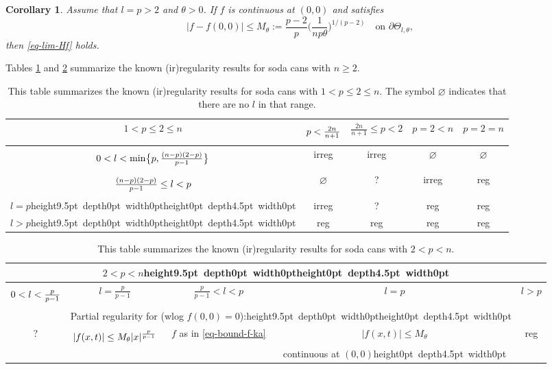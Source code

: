 \documentclass[a4paper, twoside]{article}
\theoremstyle{propositional}
\newtheorem{cor}[thm]{Corollary}
\theoremstyle{descriptive}
\numberwithin{equation}{section}
\newcommand{\strutdepth}{\hbox{\vrule height0pt depth4.5pt width0pt}}
\newcommand{\strutheight}{\hbox{\vrule height9.5pt depth0pt width0pt}}
\newcommand{\bdy}{\partial}
\renewcommand{\emptyset}{\varnothing}
\begin{document}
\begin{cor}  \label{cor-reg-l=p}
Assume that $l=p>2$ and $\theta>0$.
If $f$ is continuous at $(0,0)$ and satisfies
\begin{equation}   \label{eq-ass-with-Mtheta}   
 |f-f(0,0)| \le M_\theta
:=\frac {p-2}{p} \biggl(\frac{1}{np\theta}\biggr)^{1/(p-2)}
\quad \text{on } \bdy\Theta_{l,\theta},
\end{equation}
then \eqref{eq-lim-Hf} holds.
\end{cor}

Tables \ref{table-ex-1} and \ref{table-ex-2} summarize the known (ir)regularity results for 
soda cans with $n\ge2$.

\begin{table}[t]
\begin{center}
\begin{tabular}{|c||c|c|c|c|}
\hline
 $1<p\le 2 \le n$    & $p<\frac{2n\strutheight}{n+1\strutdepth}$ & $ \frac{2n}{n+1}\le p<2$ & $p=2<n$ &  $p=2=n$   \\  \hline  \hline
     $ 0<l<\min\bigl\{ p, \frac{(n-p)(2-p)\strutheight}{p-1\strutdepth} \bigr\}$ 
& irreg & irreg & 
$\emptyset$ & $\emptyset$ \\ \hline
     $ \frac{(n-p)(2-p)\strutheight}{p-1\strutdepth} \le l<p $ & 
$\emptyset$ & ? & irreg & reg\\ \hline
     $l=p$\strutheight\strutdepth & irreg & ? & reg & reg\\ \hline
     $l>p$\strutheight\strutdepth & reg & reg & reg & reg\\ \hline
\end{tabular}
\end{center}
\caption{This table summarizes the 
known (ir)regularity results for soda cans
with  $1<p\le 2 \le n$.
The symbol $\emptyset$
indicates that there are no $l$ in that range.
}

\label{table-ex-1}
\end{table}

\begin{table}[ht]
\begin{center}
\begin{tabular}{|c|c|c|c|c|}
\hline
\multicolumn{5}{|c|}{$2<p<n$\strutheight\strutdepth} \\ \hline
$ 0<l<\frac{p\strutheight}{p-1\strutdepth}$ & $ l=\frac{p}{p-1}$ & $ \frac{p}{p-1}<l<p$ &  $l=p$  & $l>p$ \\  \hline  \hline
 & \multicolumn{3}{|c|}{Partial regularity for (wlog $f(0,0)=0$):\strutheight\strutdepth} & \\ 
? &  $ |f(x,t)|\le M_\theta |x|^{\frac{p}{p-1}\strutheight}$ & $f$ as in \eqref{eq-bound-f-ka} & $|f(x,t)|\le M_\theta$  & reg \\ 
 &   &  & continuous at  $(0,0)$\strutdepth  & \\ \hline
\end{tabular}
\end{center}
\caption{This table summarizes the 
known (ir)regularity results for soda cans
with  $2<p<n$.
}
\label{table-ex-2}
\end{table}
\end{document}
